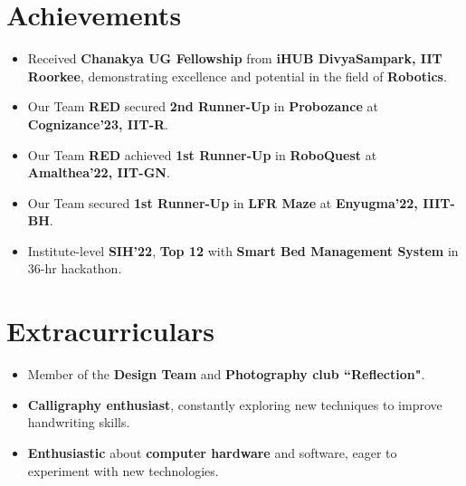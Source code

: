 \documentclass[a4paper,12pt]{article}
\begin{document}
\section{Achievements}
\begin{itemize}
\item Received \textbf{Chanakya UG Fellowship} from \textbf{iHUB DivyaSampark, IIT Roorkee}, demonstrating excellence and potential in the field of \textbf{Robotics}.\vspace{-0.5em}
\item Our Team \textbf{RED} secured \textbf{2nd Runner-Up} in \textbf{Probozance} at \textbf{Cognizance'23, IIT-R}.\vspace{-0.5em}
  \item Our Team \textbf{RED} achieved \textbf{1st Runner-Up} in \textbf{RoboQuest} at \textbf{Amalthea'22, IIT-GN}.\vspace{-0.5em}
  \item Our Team secured \textbf{1st Runner-Up} in \textbf{LFR Maze} at \textbf{Enyugma'22, IIIT-BH}.\vspace{-0.5em}
  \item Institute-level \textbf{SIH'22}, \textbf{Top 12} with \textbf{Smart Bed Management System} in 36-hr hackathon.\vspace{-0.5em}
\end{itemize}

\section{Extracurriculars}
\begin{itemize}
  \item Member of the \textbf{Design Team} and \textbf{Photography club ``Reflection"}.\vspace{-0.5em}
  \item \textbf{Calligraphy enthusiast}, constantly exploring new techniques to improve handwriting skills. \vspace{-0.5em}
  \item \textbf{Enthusiastic} about \textbf{computer hardware} and software, eager to experiment with new technologies.\vspace{-0.5em}
\end{itemize}

\vfill
{}
\end{document}

